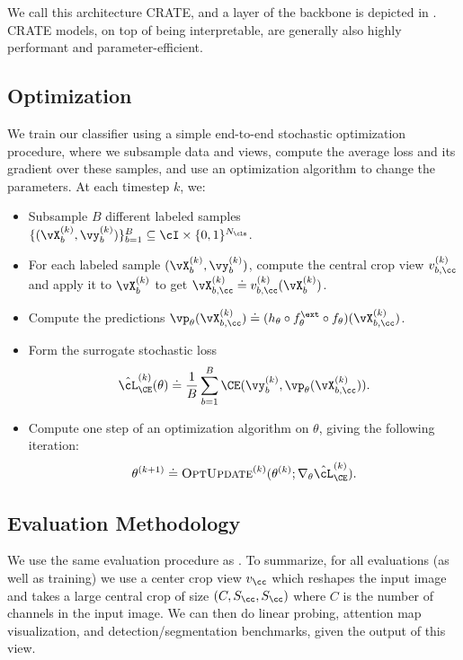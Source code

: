 \documentclass[../../book-main.tex]{subfiles}
\begin{document}
We call this architecture CRATE, and a layer of the backbone is depicted in . CRATE models, on top of being interpretable, are generally also highly performant and parameter-efficient. 

\subsection{Optimization} \label{sub:image_classification_optimization}

We train our classifier using a simple end-to-end stochastic optimization procedure, where we subsample data and views, compute the average loss and its gradient over these samples, and use an optimization algorithm to change the parameters. At each timestep \(k\), we:
\begin{itemize}
    \item Subsample \(B\) different labeled samples \(\{(\vX_{b}^{(k)}, \vy_{b}^{(k)})\}_{b = 1}^{B} \subseteq \cI \times \{0, 1\}^{N_{\cls}}\).
    \item For each labeled sample \((\vX_{b}^{(k)}, \vy_{b}^{(k)})\), compute the central crop view \(v_{b, \cc}^{(k)}\) and apply it to \(\vX_{b}^{(k)}\) to get \(\vX_{b, \cc}^{(k)} \doteq v_{b, \cc}^{(k)}(\vX_{b}^{(k)})\).
    \item Compute the predictions \(\vp_{\theta}(\vX_{b, \cc}^{(k)}) \doteq (h_{\theta} \circ f_{\theta}^{\ext} \circ f_{\theta})(\vX_{b, \cc}^{(k)})\).
    \item Form the surrogate stochastic loss 
    \begin{equation}
        \hat{\cL}_{\CE}^{(k)}(\theta) \doteq \frac{1}{B}\sum_{b = 1}^{B}\CE(\vy_{b}^{(k)}, \vp_{\theta}(\vX_{b, \cc}^{(k)})).
    \end{equation}
    \item Compute one step of an optimization algorithm on \(\theta\), giving the following iteration:
    \begin{equation}
        \theta^{(k + 1)} \doteq \textsc{OptUpdate}^{(k)}(\theta^{(k)}; \nabla_{\theta}\hat{\cL}_{\CE}^{(k)}).
    \end{equation}
\end{itemize}


\subsection{Evaluation Methodology} \label{sub:image_classification_evals}

We use the same evaluation procedure as . To summarize, for all evaluations (as well as training) we use a center crop view \(v_{\cc}\) which reshapes the input image and takes a large central crop of size \((C, S_{\cc}, S_{\cc})\) where \(C\) is the number of channels in the input image. We can then do linear probing, attention map visualization, and detection/segmentation benchmarks, given the output of this view.
\end{document}
